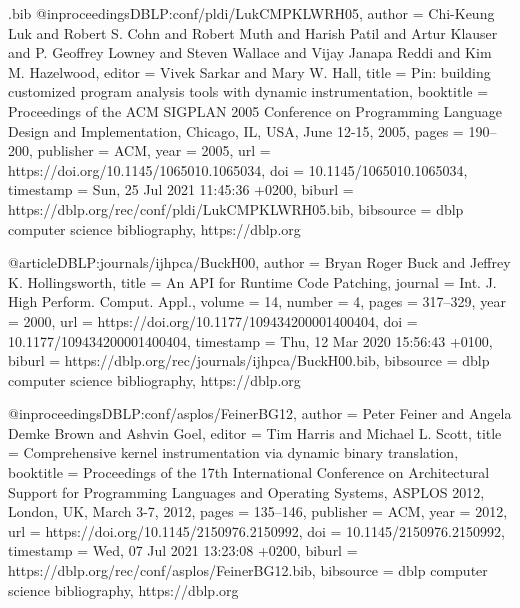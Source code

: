 \begin{filecontents}{\jobname.bib}
@inproceedings{DBLP:conf/pldi/LukCMPKLWRH05,
  author       = {Chi{-}Keung Luk and
                  Robert S. Cohn and
                  Robert Muth and
                  Harish Patil and
                  Artur Klauser and
                  P. Geoffrey Lowney and
                  Steven Wallace and
                  Vijay Janapa Reddi and
                  Kim M. Hazelwood},
  editor       = {Vivek Sarkar and
                  Mary W. Hall},
  title        = {Pin: building customized program analysis tools with dynamic instrumentation},
  booktitle    = {Proceedings of the {ACM} {SIGPLAN} 2005 Conference on Programming
                  Language Design and Implementation, Chicago, IL, USA, June 12-15,
                  2005},
  pages        = {190--200},
  publisher    = {{ACM}},
  year         = {2005},
  url          = {https://doi.org/10.1145/1065010.1065034},
  doi          = {10.1145/1065010.1065034},
  timestamp    = {Sun, 25 Jul 2021 11:45:36 +0200},
  biburl       = {https://dblp.org/rec/conf/pldi/LukCMPKLWRH05.bib},
  bibsource    = {dblp computer science bibliography, https://dblp.org}
}

@article{DBLP:journals/ijhpca/BuckH00,
  author       = {Bryan Roger Buck and
                  Jeffrey K. Hollingsworth},
  title        = {An {API} for Runtime Code Patching},
  journal      = {Int. J. High Perform. Comput. Appl.},
  volume       = {14},
  number       = {4},
  pages        = {317--329},
  year         = {2000},
  url          = {https://doi.org/10.1177/109434200001400404},
  doi          = {10.1177/109434200001400404},
  timestamp    = {Thu, 12 Mar 2020 15:56:43 +0100},
  biburl       = {https://dblp.org/rec/journals/ijhpca/BuckH00.bib},
  bibsource    = {dblp computer science bibliography, https://dblp.org}
}

@inproceedings{DBLP:conf/asplos/FeinerBG12,
  author       = {Peter Feiner and
                  Angela Demke Brown and
                  Ashvin Goel},
  editor       = {Tim Harris and
                  Michael L. Scott},
  title        = {Comprehensive kernel instrumentation via dynamic binary translation},
  booktitle    = {Proceedings of the 17th International Conference on Architectural
                  Support for Programming Languages and Operating Systems, {ASPLOS}
                  2012, London, UK, March 3-7, 2012},
  pages        = {135--146},
  publisher    = {{ACM}},
  year         = {2012},
  url          = {https://doi.org/10.1145/2150976.2150992},
  doi          = {10.1145/2150976.2150992},
  timestamp    = {Wed, 07 Jul 2021 13:23:08 +0200},
  biburl       = {https://dblp.org/rec/conf/asplos/FeinerBG12.bib},
  bibsource    = {dblp computer science bibliography, https://dblp.org}
}


\end{filecontents}
